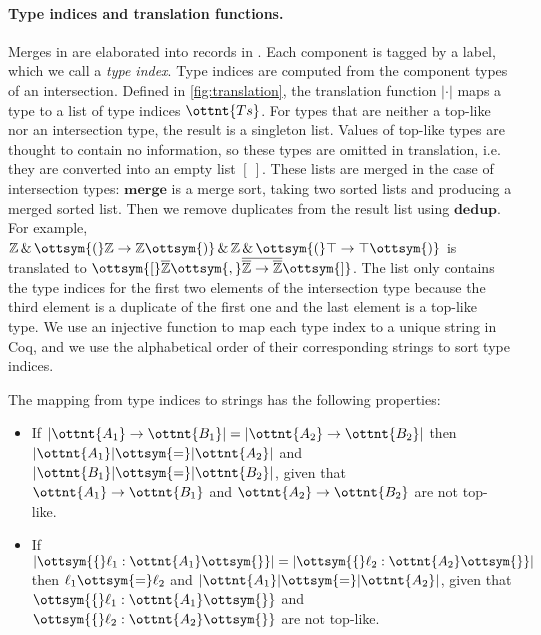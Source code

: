 \paragraph{Type indices and translation functions.}
Merges in \lambdaiplus are elaborated into records in \lambdar. Each component
is tagged by a label, which we call a \emph{type index}. Type indices are
computed from the component types of an intersection. Defined in
\autoref{fig:translation}, the translation function $| \cdot |$ maps a type to
a list of type indices $\ottnt{Ts}$. For types that are neither a top-like nor an
intersection type, the result is a singleton list. Values of top-like types are
thought to contain no information, so these types are omitted in translation,
i.e. they are converted into an empty list $ [~] $. These lists are merged in
the case of intersection types: $ \textbf{merge} $ is a merge sort, taking two
sorted lists and producing a merged sorted list. Then we remove duplicates from
the result list using $ \textbf{dedup} $. For example,
$ \mathbb{Z}   \, {\&} \,  \ottsym{(}   \mathbb{Z}   \rightarrow   \mathbb{Z}   \ottsym{)}  \, {\&} \,   \mathbb{Z}   \, {\&} \,  \ottsym{(}   \top   \rightarrow   \top   \ottsym{)}$ is translated to
$\ottsym{[}   \overline{\mathbb{Z} }   \ottsym{,}   \overline{  \overline{\mathbb{Z} }  \rightarrow  \overline{\mathbb{Z} }  }   \ottsym{]}$. The list only contains the type indices for the
first two elements of the intersection type because the third element is a
duplicate of the first one and the last element is a top-like type. We use an
injective function to map each type index to a unique string in Coq, and we use
the alphabetical order of their corresponding strings to sort type indices.

\begin{lemma}[Translation]
  The mapping from type indices to strings has the following properties:
  \begin{itemize}
  \item If $  | \ottnt{A_{{\mathrm{1}}}}  \rightarrow  \ottnt{B_{{\mathrm{1}}}} |  =   | \ottnt{A_{{\mathrm{2}}}}  \rightarrow  \ottnt{B_{{\mathrm{2}}}} | $ then $ | \ottnt{A_{{\mathrm{1}}}} |   \ottsym{=}   | \ottnt{A_{{\mathrm{2}}}} | $ and
    $ | \ottnt{B_{{\mathrm{1}}}} |   \ottsym{=}   | \ottnt{B_{{\mathrm{2}}}} | $, given that $\ottnt{A_{{\mathrm{1}}}}  \rightarrow  \ottnt{B_{{\mathrm{1}}}}$ and $\ottnt{A_{{\mathrm{2}}}}  \rightarrow  \ottnt{B_{{\mathrm{2}}}}$ are not top-like.
  \item If $  | \ottsym{\{}  \ell_{{\mathrm{1}}}  :  \ottnt{A_{{\mathrm{1}}}}  \ottsym{\}} |  =   | \ottsym{\{}  \ell_{{\mathrm{2}}}  :  \ottnt{A_{{\mathrm{2}}}}  \ottsym{\}} | $ then $\ell_{{\mathrm{1}}}  \ottsym{=}  \ell_{{\mathrm{2}}}$ and
    $ | \ottnt{A_{{\mathrm{1}}}} |   \ottsym{=}   | \ottnt{A_{{\mathrm{2}}}} | $, given that $\ottsym{\{}  \ell_{{\mathrm{1}}}  :  \ottnt{A_{{\mathrm{1}}}}  \ottsym{\}}$ and $\ottsym{\{}  \ell_{{\mathrm{2}}}  :  \ottnt{A_{{\mathrm{2}}}}  \ottsym{\}}$ are not top-like.
    \end{itemize}
\end{lemma}

